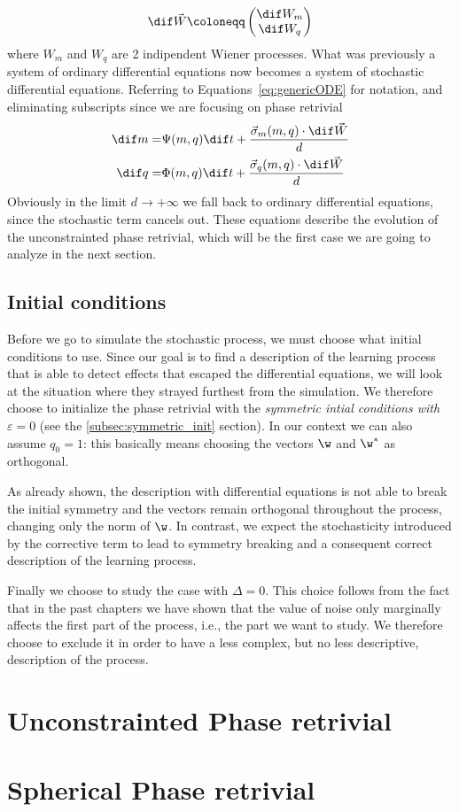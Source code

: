 \[
  \dif \vec{W} \coloneqq 
  \begin{pmatrix}
    \dif W_m \\
    \dif W_q
  \end{pmatrix}
\]
where \(W_m\) and \(W_q\) are 2 indipendent Wiener processes.
What was previously a system of ordinary differential equations now becomes a system of stochastic differential equations.
Referring to Equations~\eqref{eq:genericODE} for notation, and eliminating subscripts since we are focusing on phase retrivial
\begin{subequations}\begin{align}
  \dif m =& \Psi{(m,q)}\dif t + \frac{\vec{\sigma}_m{(m,q)}\cdot\dif \vec{W}}{d} \\
  \dif q =& \Phi{(m,q)}\dif t + \frac{\vec{\sigma}_q{(m,q)}\cdot\dif \vec{W}}{d} 
\end{align}\end{subequations}
Obviously in the limit \(d\to+\infty\) we fall back to ordinary differential equations,
since the stochastic term cancels out.
These equations describe the evolution of the unconstrainted phase retrivial,
which will be the first case we are going to analyze in the next section.

\subsection{Initial conditions}
Before we go to simulate the stochastic process, we must choose what initial conditions to use.
Since our goal is to find a description of the learning process that is able to detect effects that escaped the differential equations,
we will look at the situation where they strayed furthest from the simulation. 
We therefore choose to initialize the phase retrivial with the \emph{symmetric intial conditions with \(\varepsilon = 0\)} (see the \ref{subsec:symmetric_init} section).
In our context we can also assume \(q_0 = 1\): this basically means choosing the vectors \(\w\) and \(\w^*\) as orthogonal.

As already shown, the description with differential equations is not able to break the initial symmetry and the vectors remain orthogonal throughout the process,
changing only the norm of \(\w\).
In contrast, we expect the stochasticity introduced by the corrective term to lead to symmetry breaking and a consequent correct description of the learning process.

Finally we choose to study the case with \(\Delta=0\). 
This choice follows from the fact that in the past chapters we have shown that the value of noise only marginally affects the first part of the process,
i.e., the part we want to study. We therefore choose to exclude it in order to have a less complex,
but no less descriptive, description of the process.
\section{Unconstrainted Phase retrivial}


\section{Spherical Phase retrivial}




